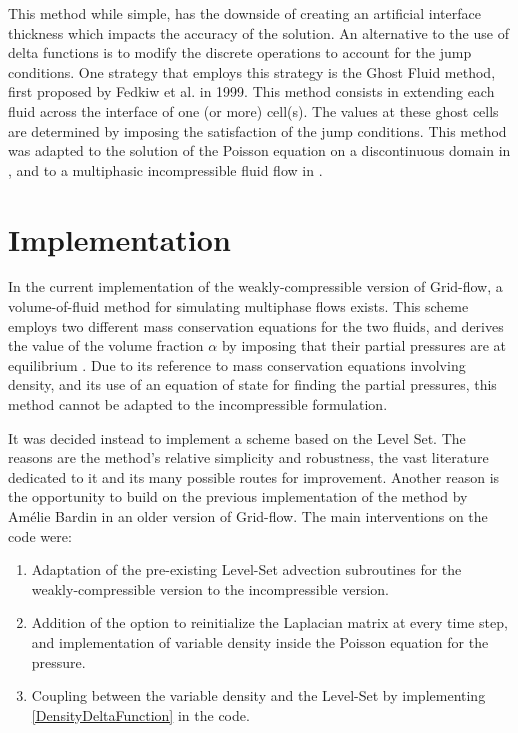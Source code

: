 \documentclass[11pt, a4paper, oneside, openany]{book}
\begin{document}
This method while simple, has the downside of creating an artificial interface thickness which impacts the accuracy of the solution.
An alternative to the use of delta functions is to modify the discrete operations to account for the jump conditions. One strategy that employs this strategy is the Ghost Fluid method, first proposed by Fedkiw et al. \cite{fedkiw1999non} in 1999. This method consists in extending each fluid across the interface of one (or more) cell(s). The values at these ghost cells are determined by imposing the satisfaction of the jump conditions. This method was adapted to the solution of the Poisson equation on a discontinuous domain in \cite{liu2000boundary}, and to a multiphasic incompressible fluid flow in \cite{kang2000boundary}. 

\chapter{Implementation}\label{Chapter_Implementation}
In the current implementation of the weakly-compressible version of Grid-flow, a volume-of-fluid method for simulating multiphase flows exists. This scheme employs two different mass conservation equations for the two fluids, and derives the value of the volume fraction $\alpha$ by imposing that their partial pressures are at equilibrium \cite{Li2020}. Due to its reference to mass conservation equations involving density, and its use of an equation of state for finding the partial pressures, this method cannot be adapted to the incompressible formulation.\par
It was decided instead to implement a scheme based on the Level Set. The reasons are the method's relative simplicity and robustness, the vast literature dedicated to it and its many possible routes for improvement. Another reason is the opportunity to build on the previous implementation of the method by Am{\'{e}}lie Bardin \cite{Bardin2015} in an older version of Grid-flow.
The main interventions on the code were:
\begin{enumerate}
	\item Adaptation of the pre-existing Level-Set advection subroutines for the weakly-compressible version to the incompressible version. 
	\item Addition of the option to reinitialize the Laplacian matrix at every time step, and implementation of variable density inside the Poisson equation for the pressure.
	\item Coupling between the variable density and the Level-Set by implementing \eqref{DensityDeltaFunction} in the code.
\end{enumerate} 
\end{document}
